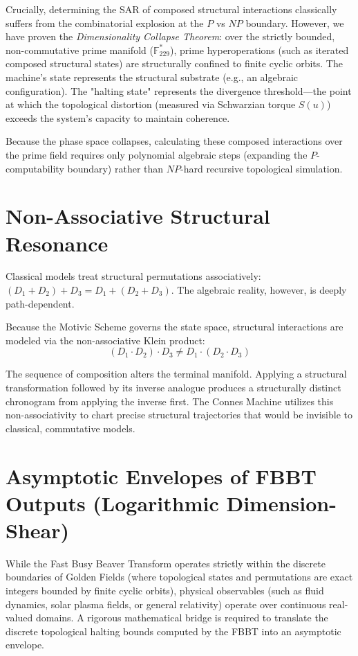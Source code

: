 Crucially, determining the SAR of composed structural interactions classically suffers from the combinatorial explosion at the $P$ vs $NP$ boundary. However, we have proven the \textit{Dimensionality Collapse Theorem}: over the strictly bounded, non-commutative prime manifold ($\mathbb{F}_{229}^*$), prime hyperoperations (such as iterated composed structural states) are structurally confined to finite cyclic orbits. The machine's state represents the structural substrate (e.g., an algebraic configuration). The "halting state" represents the divergence threshold---the point at which the topological distortion (measured via Schwarzian torque $S(u)$) exceeds the system's capacity to maintain coherence. 

Because the phase space collapses, calculating these composed interactions over the prime field requires only polynomial algebraic steps (expanding the $P$-computability boundary) rather than $NP$-hard recursive topological simulation.

\section{Non-Associative Structural Resonance}

Classical models treat structural permutations associatively: $(D_1 + D_2) + D_3 = D_1 + (D_2 + D_3)$. The algebraic reality, however, is deeply path-dependent. 

Because the Motivic Scheme governs the state space, structural interactions are modeled via the non-associative Klein product:
\begin{equation}
    (D_1 \cdot D_2) \cdot D_3 \neq D_1 \cdot (D_2 \cdot D_3)
\end{equation}

The sequence of composition alters the terminal manifold. Applying a structural transformation followed by its inverse analogue produces a structurally distinct chronogram from applying the inverse first. The Connes Machine utilizes this non-associativity to chart precise structural trajectories that would be invisible to classical, commutative models.

\section{Asymptotic Envelopes of FBBT Outputs (Logarithmic Dimension-Shear)}

While the Fast Busy Beaver Transform operates strictly within the discrete boundaries of Golden Fields (where topological states and permutations are exact integers bounded by finite cyclic orbits), physical observables (such as fluid dynamics, solar plasma fields, or general relativity) operate over continuous real-valued domains. A rigorous mathematical bridge is required to translate the discrete topological halting bounds computed by the FBBT into an asymptotic envelope.


